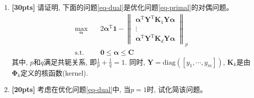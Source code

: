 \documentclass[a4paper,UTF8]{article}
\numberwithin{equation}{section}
\theoremstyle{definition}
\begin{document}
\begin{enumerate}[(1)]
\item{ \textbf{[30pts]} 请证明, 下面的问题\ref{eq-dual}是优化问题\ref{eq-primal}的对偶问题。
\begin{equation}
\label{eq-dual}
	\begin{split}
\max_{\bm \alpha} &\quad 2\bm \alpha^\mathrm T \mathbf{1}- \left\lVert
 \begin{matrix}
   \bm \alpha^\mathrm{T}\mathbf Y^\mathrm{T} \mathbf K_1 \mathbf Y  \bm \alpha \\
   \vdots \\
  \bm \alpha^\mathrm{T}\mathbf Y^\mathrm{T} \mathbf K_d \mathbf Y  \bm \alpha 
  \end{matrix}
  \right\rVert_p\\
  \text{s.t.} &\quad  \mathbf{0} \leq \bm \alpha  \leq \mathbf{C} 
  \end{split}
\end{equation}
其中, $p$和$q$满足共轭关系, 即$\frac{1}{p}+\frac{1}{q}=1$. 同时, $\mathbf Y = \text{diag}([y_1,\cdots,y_m])$, $\mathbf K_k$是由$\bm \Phi_k$定义的核函数(kernel).}
\item{ \textbf{[20pts]} 考虑在优化问题\ref{eq-dual}中, 当$p=1$时, 试化简该问题。}
\end{enumerate}
\end{document}
